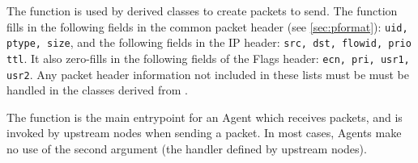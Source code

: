The  function is used by derived classes to create
packets to send.
The function fills in the following fields in the common packet
header (see \ref{sec:pformat}): {\tt uid, ptype, size}, and the
following fields in the IP header: {\tt src, dst, flowid, prio ttl}.
It also zero-fills in the following fields of the Flags header:
{\tt ecn, pri, usr1, usr2}.
Any packet header information not included in these lists must
be must be handled in the classes derived from .

The  function is the main entrypoint for an
Agent which receives packets, and
is invoked by upstream nodes when sending a packet.
In most cases, Agents make no use of the second argument (the handler
defined by upstream nodes).

\subsection{}

